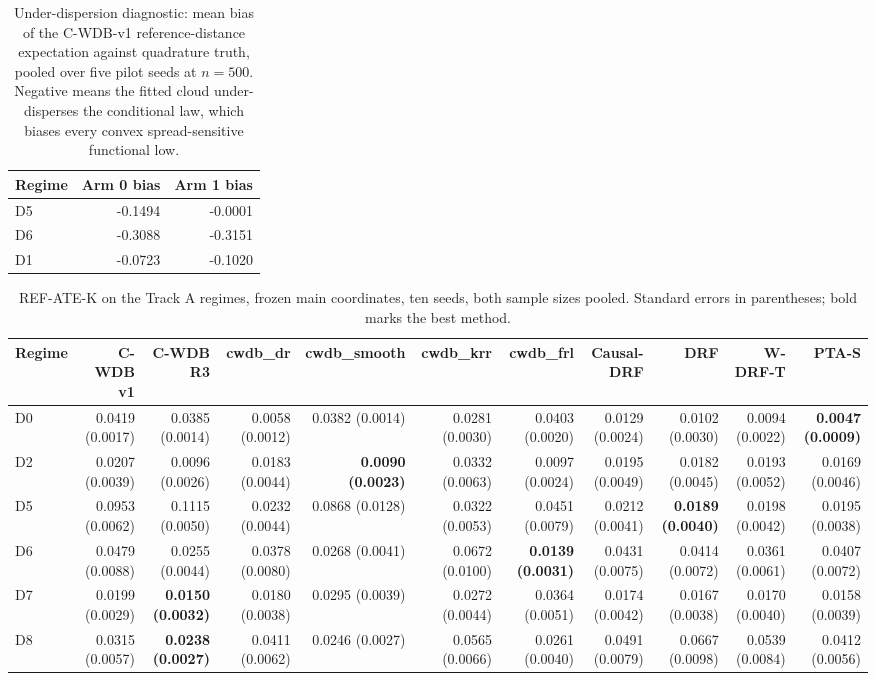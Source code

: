 \begin{table}[htbp]
\centering
\caption{Under-dispersion diagnostic: mean bias of the C-WDB-v1 reference-distance expectation against quadrature truth, pooled over five pilot seeds at $n=500$. Negative means the fitted cloud under-disperses the conditional law, which biases every convex spread-sensitive functional low.}
\label{tab:p6-diag}
\small
\begin{tabular}{@{}lrr@{}}
\toprule
Regime & Arm 0 bias & Arm 1 bias \\ 
\midrule
D5 & -0.1494 & -0.0001 \\ 
D6 & -0.3088 & -0.3151 \\ 
D1 & -0.0723 & -0.1020 \\ 
\bottomrule
\end{tabular}
\end{table}


\begin{table}[htbp]
\centering
\caption{REF-ATE-K on the Track A regimes, frozen main coordinates, ten seeds, both sample sizes pooled. Standard errors in parentheses; bold marks the best method.}
\label{tab:p6-tracka-reference_effect_rmse}
\small
\begin{tabular}{@{}lrrrrrrrrrr@{}}
\toprule
Regime & C-WDB v1 & C-WDB R3 & cwdb\_dr & cwdb\_smooth & cwdb\_krr & cwdb\_frl & Causal-DRF & DRF & W-DRF-T & PTA-S \\ 
\midrule
D0 & 0.0419 (0.0017) & 0.0385 (0.0014) & 0.0058 (0.0012) & 0.0382 (0.0014) & 0.0281 (0.0030) & 0.0403 (0.0020) & 0.0129 (0.0024) & 0.0102 (0.0030) & 0.0094 (0.0022) & \textbf{0.0047 (0.0009)} \\ 
D2 & 0.0207 (0.0039) & 0.0096 (0.0026) & 0.0183 (0.0044) & \textbf{0.0090 (0.0023)} & 0.0332 (0.0063) & 0.0097 (0.0024) & 0.0195 (0.0049) & 0.0182 (0.0045) & 0.0193 (0.0052) & 0.0169 (0.0046) \\ 
D5 & 0.0953 (0.0062) & 0.1115 (0.0050) & 0.0232 (0.0044) & 0.0868 (0.0128) & 0.0322 (0.0053) & 0.0451 (0.0079) & 0.0212 (0.0041) & \textbf{0.0189 (0.0040)} & 0.0198 (0.0042) & 0.0195 (0.0038) \\ 
D6 & 0.0479 (0.0088) & 0.0255 (0.0044) & 0.0378 (0.0080) & 0.0268 (0.0041) & 0.0672 (0.0100) & \textbf{0.0139 (0.0031)} & 0.0431 (0.0075) & 0.0414 (0.0072) & 0.0361 (0.0061) & 0.0407 (0.0072) \\ 
D7 & 0.0199 (0.0029) & \textbf{0.0150 (0.0032)} & 0.0180 (0.0038) & 0.0295 (0.0039) & 0.0272 (0.0044) & 0.0364 (0.0051) & 0.0174 (0.0042) & 0.0167 (0.0038) & 0.0170 (0.0040) & 0.0158 (0.0039) \\ 
D8 & 0.0315 (0.0057) & \textbf{0.0238 (0.0027)} & 0.0411 (0.0062) & 0.0246 (0.0027) & 0.0565 (0.0066) & 0.0261 (0.0040) & 0.0491 (0.0079) & 0.0667 (0.0098) & 0.0539 (0.0084) & 0.0412 (0.0056) \\ 
\bottomrule
\end{tabular}
\end{table}


